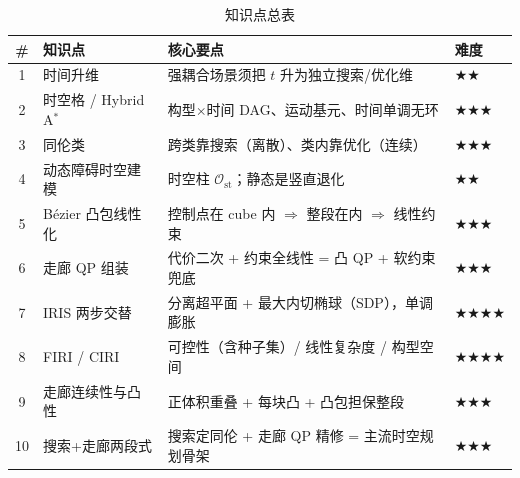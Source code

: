 \begin{table}[H]\centering\small
\caption{知识点总表}
\label{tab:stc-knowledge}
\begin{tabular}{clll}
\toprule
\# & 知识点 & 核心要点 & 难度 \\
\midrule
1 & 时间升维 & 强耦合场景须把 $t$ 升为独立搜索/优化维 & \(\bigstar\bigstar\) \\
2 & 时空格 / Hybrid A$^*$ & 构型$\times$时间 DAG、运动基元、时间单调无环 & \(\bigstar\bigstar\bigstar\) \\
3 & 同伦类 & 跨类靠搜索（离散）、类内靠优化（连续） & \(\bigstar\bigstar\bigstar\) \\
4 & 动态障碍时空建模 & 时空柱 $\mathcal{O}_{\mathrm{st}}$；静态是竖直退化 & \(\bigstar\bigstar\) \\
5 & Bézier 凸包线性化 & 控制点在 cube 内 $\Rightarrow$ 整段在内 $\Rightarrow$ 线性约束 & \(\bigstar\bigstar\bigstar\) \\
6 & 走廊 QP 组装 & 代价二次 + 约束全线性 = 凸 QP + 软约束兜底 & \(\bigstar\bigstar\bigstar\) \\
7 & IRIS 两步交替 & 分离超平面 + 最大内切椭球（SDP），单调膨胀 & \(\bigstar\bigstar\bigstar\bigstar\) \\
8 & FIRI / CIRI & 可控性（含种子集）/ 线性复杂度 / 构型空间 & \(\bigstar\bigstar\bigstar\bigstar\) \\
9 & 走廊连续性与凸性 & 正体积重叠 + 每块凸 + 凸包担保整段 & \(\bigstar\bigstar\bigstar\) \\
10 & 搜索+走廊两段式 & 搜索定同伦 + 走廊 QP 精修 = 主流时空规划骨架 & \(\bigstar\bigstar\bigstar\) \\
\bottomrule
\end{tabular}
\end{table}

